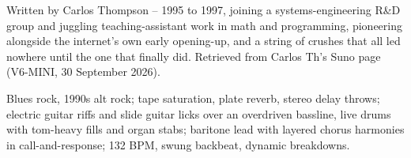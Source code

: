 
\begin{notes}
Written by Carlos Thompson -- 1995 to 1997, joining a systems-engineering R\&D group and juggling teaching-assistant work in math and programming, pioneering alongside the internet's own early opening-up, and a string of crushes that all led nowhere until the one that finally did. Retrieved from Carlos Th's Suno page (V6-MINI, 30 September 2026).
\end{notes}
\begin{style}
Blues rock, 1990s alt rock; tape saturation, plate reverb, stereo delay throws; electric guitar riffs and slide guitar licks over an overdriven bassline, live drums with tom-heavy fills and organ stabs; baritone lead with layered chorus harmonies in call-and-response; 132 BPM, swung backbeat, dynamic breakdowns.
\end{style}
